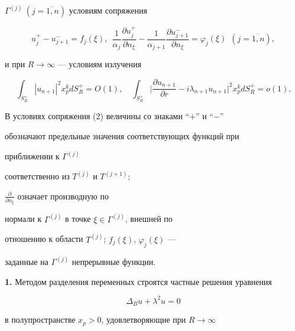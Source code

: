 $\Gamma^{(j)}\ (j=\overline{1,n})$ условиям сопряжения


\begin{equation}


u_j^+-u_{j+1}^-=f_j(\xi),\ \


\frac{1}{\alpha_j}\frac{\partial u_j^+}{\partial n_{\xi}}-


\frac{1}{\alpha_{j+1}}\frac{\partial u_{j+1}^-}{\partial n_{\xi}}


=\varphi_j(\xi)\ \ (j=\overline{1,n}),


\end{equation}


и при $R\to \infty$ --- условиям излучения


\begin{equation}


\int_{S_R^{+}}|u_{n+1}|^2 x_p^k dS_R^{+}=O(1),\quad


\int_{S_R^{+}}\bigg|\frac{\partial u_{n+1}}{\partial r}


-i\lambda_{n+1} u_{n+1} \bigg|^2 x_p^k dS_R^{+}=o(1).


\end{equation}








В условиях сопряжения (2) величины со знаками ``$+$'' и ``$-$''


обозначают предельные значения соответствующих функций при


приближении к $\Gamma^{(j)}$


 соответственно из $T^{(j)}$ и $T^{(j+1)}$;


$\frac{\partial}{\partial n_{\xi}}$ означает производную по


нормали к $\Gamma^{(j)}$ в точке $\xi\in \Gamma^{(j)}$, внешней по


отношению к области $T^{(j)}$; $f_j(\xi)$, $\varphi_j(\xi)$ ---


заданные на $\Gamma^{(j)}$ непрерывные функции.


\medskip





{\bf 1.} Методом разделения переменных строятся частные решения уравнения


$$


\Delta_B u+\lambda^2 u=0


$$


в полупространстве $x_p>0$, удовлетворяющие при $R \to \infty$


